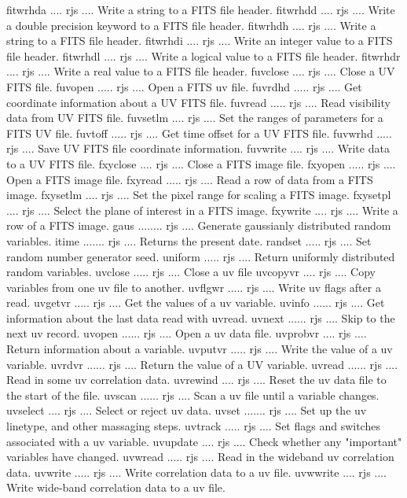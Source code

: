 {\eightpoint\begintt
fitwrhda .... rjs .... Write a string to a FITS file header. 
fitwrhdd .... rjs .... Write a double precision keyword to a FITS file header. 
fitwrhdh .... rjs .... Write a string to a FITS file header. 
fitwrhdi .... rjs .... Write an integer value to a FITS file header. 
fitwrhdl .... rjs .... Write a logical value to a FITS file header. 
\endtt}
{\eightpoint\begintt
fitwrhdr .... rjs .... Write a real value to a FITS file header. 
fuvclose .... rjs .... Close a UV FITS file. 
fuvopen ..... rjs .... Open a FITS uv file. 
fuvrdhd ..... rjs .... Get coordinate information about a UV FITS file. 
fuvread ..... rjs .... Read visibility data from UV FITS file. 
\endtt}
{\eightpoint\begintt
fuvsetlm .... rjs .... Set the ranges of parameters for a FITS UV file. 
fuvtoff ..... rjs .... Get time offset for a UV FITS file. 
fuvwrhd ..... rjs .... Save UV FITS file coordinate information. 
fuvwrite .... rjs .... Write data to a UV FITS file. 
fxyclose .... rjs .... Close a FITS image file. 
\endtt}
{\eightpoint\begintt
fxyopen ..... rjs .... Open a FITS image file. 
fxyread ..... rjs .... Read a row of data from a FITS image. 
fxysetlm .... rjs .... Set the pixel range for scaling a FITS image. 
fxysetpl .... rjs .... Select the plane of interest in a FITS image. 
fxywrite .... rjs .... Write a row of a FITS image. 
\endtt}
{\eightpoint\begintt
gaus ........ rjs .... Generate gaussianly distributed random variables. 
itime ....... rjs .... Returns the present date. 
randset ..... rjs .... Set random number generator seed. 
uniform ..... rjs .... Return uniformly distributed random variables. 
uvclose ..... rjs .... Close a uv file 
\endtt}
{\eightpoint\begintt
uvcopyvr .... rjs .... Copy variables from one uv file to another. 
uvflgwr ..... rjs .... Write uv flags after a read. 
uvgetvr ..... rjs .... Get the values of a uv variable. 
uvinfo ...... rjs .... Get information about the last data read with uvread. 
uvnext ...... rjs .... Skip to the next uv record. 
\endtt}
{\eightpoint\begintt
uvopen ...... rjs .... Open a uv data file. 
uvprobvr .... rjs .... Return information about a variable. 
uvputvr ..... rjs .... Write the value of a uv variable. 
uvrdvr ...... rjs .... Return the value of a UV variable. 
uvread ...... rjs .... Read in some uv correlation data. 
\endtt}
{\eightpoint\begintt
uvrewind .... rjs .... Reset the uv data file to the start of the file. 
uvscan ...... rjs .... Scan a uv file until a variable changes. 
uvselect .... rjs .... Select or reject uv data. 
uvset ....... rjs .... Set up the uv linetype, and other massaging steps. 
uvtrack ..... rjs .... Set flags and switches associated with a uv variable. 
\endtt}
{\eightpoint\begintt
uvupdate .... rjs .... Check whether any "important" variables have changed. 
uvwread ..... rjs .... Read in the wideband uv correlation data. 
uvwrite ..... rjs .... Write correlation data to a uv file. 
uvwwrite .... rjs .... Write wide-band correlation data to a uv file. 
\endtt}
